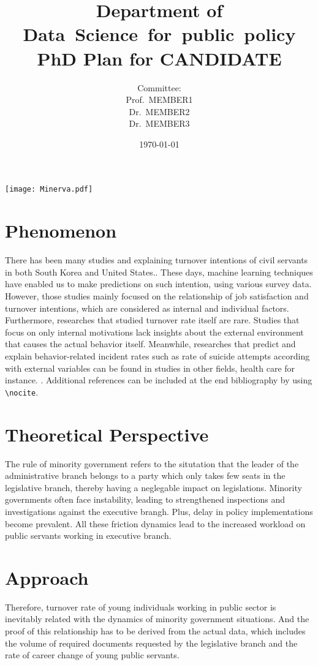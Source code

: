 \documentclass{tufte-handout}
\title[PhD Plan for CANDIDATE]{Department of \mbox{Data Science for public policy}\\PhD Plan for CANDIDATE}
\author[]{Committee:\\
Prof.~MEMBER1\\
Dr.~MEMBER2\\
Dr.~MEMBER3}
\date{\today}
\begin{document}
\maketitle%

\begin{marginfigure}[-5.2cm]
\texttt{[image: Minerva.pdf]}
\end{marginfigure}

\section{Phenomenon}
There has been many studies and explaining turnover intentions of civil servants in both South Korea and United States.\cite{HenrichMcElreath:2003}. These days, machine learning techniques have enabled us to make predictions on such intention, using various survey data. However, those studies mainly focused on the relationship of job satisfaction and turnover intentions, which are considered as internal and individual factors. Furthermore, researches that studied turnover rate itself are rare. Studies that focus on only internal motivations lack insights about the external environment that causes the actual behavior itself. Meanwhile, researches that predict and explain behavior-related incident rates such as rate of suicide attempts according with external variables can be found in studies in other fields, health care for instance.
.\cite{HenrichMcElreath:2003} Additional references can be included at the end bibliography by using \verb|\nocite|. \nocite{NBGA2005}

\section{Theoretical Perspective}
The rule of minority government refers to the situtation that the leader of the administrative branch belongs to a party which only takes few seats in the legislative branch, thereby having a neglegable impact on legislations. Minority governments often face instability, leading to strengthened inspections and investigations against the executive brangh. Plus, delay in policy implementations become prevalent. All these friction dynamics lead to the increased workload on public servants working in executive branch.

\section{Approach}
Therefore, turnover rate of young individuals working in public sector is inevitably related with the dynamics of minority government situations. And the proof of this relationship has to be derived from the actual data,  which includes the volume of required documents requested by the legislative branch and the rate of career change of young public servants.
\end{document}
